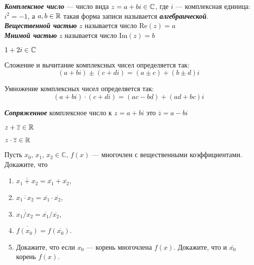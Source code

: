 \documentclass{article}
\begin{document}
\large


\setcounter{task_boxed}{0}

\begin{definition_boxed}
	\textbf{\textit{Комплексное число}} — число вида $z = a+bi \in \mathbb{C}$, где $i$ — комплексная единица: $i^2 = -1$, а $a, b \in \mathbb{R}$ такая форма записи называется \textbf{\textit{алгебраической}}.\\
	\textbf{\textit{Вещественной частью}} $z$ называется число $\text{Re}(z) = a$\\
	\textbf{\textit{Мнимой частью}} $z$ называется число $\text{Im}(z) = b$
\end{definition_boxed}

\begin{example}
$1 + 2i \in \mathbb{C}$
\end{example}


\begin{definition_boxed}
	Сложение и вычитание комплексных чисел определяется так:
	\[(a + bi) \pm (c + di) = (a \pm c) + (b \pm d)i\]
\end{definition_boxed}

\begin{definition_boxed}
	Умножение комплексных чисел определяется так:
	\[(a + bi) \cdot (c + di) = (ac - bd) + (ad + bc)i\]
\end{definition_boxed}

\begin{definition_boxed}
	\textbf{\textit{Сопряженное}} комплексное число к $z = a + bi$ это $\overline{z} = a - bi$
\end{definition_boxed}

\begin{example}
	$z + \overline{z} \in \mathbb{R}$
\end{example}

\begin{example}
	$z \cdot \overline{z} \in \mathbb{R}$
\end{example}

\begin{task_boxed}
	Пусть $x_0$, $x_1$, $x_2\in \mathbb{C}$, $f(x)$ --- многочлен с вещественными коэффициентами.
	Докажите, что
	\begin{enumerate}
		\item $\overline{x_1+x_2}=\overline{x_1}+\overline{x_2}$,
		\item $\overline{x_1\cdot x_2}=\overline{x_1}\cdot \overline{x_2}$,
		\item $\overline{x_1/x_2}=\overline{x_1}/\overline{x_2}$,
		\item $\overline{f(x_0)}=f(\overline{x_0})$.
		\item Докажите, что если $x_0$ --- корень многочлена $f(x)$.
		Докажите, что и $\overline{x_0}$ корень $f(x)$.
	\end{enumerate}
\end{task_boxed}
\end{document}
